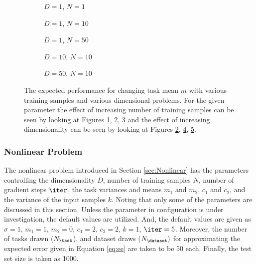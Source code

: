 \begin{figure}[!h]
  \centering
    \begin{subfigure}{0.3\textwidth}
      \centering
      \caption{$D=1$, $N=1$}
      \label{fig:linear-m-N-1-D-1}
    \end{subfigure}
    \begin{subfigure}{0.3\textwidth}
      \centering
      \caption{$D=1$, $N=10$}
      \label{fig:linear-m-N-10-D-1}
    \end{subfigure}
    \begin{subfigure}{0.3\textwidth}
      \centering
      \caption{$D=1$, $N=50$}
      \label{fig:linear-m-N-50-D-1}
    \end{subfigure}

    \begin{subfigure}{0.3\textwidth}
      \centering
      \caption{$D=10$, $N=10$}
      \label{fig:linear-m-N-10-D-10}
    \end{subfigure}
    \begin{subfigure}{0.3\textwidth}
      \centering
      \caption{$D=50$, $N=10$}
      \label{fig:linear-m-N-10-D-50}
    \end{subfigure}  

  \caption{The expected performance for changing task mean $m$ with various training samples and various dimensional problems. For the given parameter the effect of increasing number of training samples can be seen by looking at Figures \ref{fig:linear-m-N-1-D-1}, \ref{fig:linear-m-N-10-D-1}, \ref{fig:linear-m-N-50-D-1} and the effect of increasing dimensionality can be seen by looking at Figures \ref{fig:linear-m-N-10-D-1}, \ref{fig:linear-m-N-10-D-10}, \ref{fig:linear-m-N-10-D-50}.}\label{fig:linear-m}
\end{figure}

\subsubsection{Nonlinear Problem}

The nonlinear problem introduced in Section \ref{sec:Nonlinear} has the parameters controlling the dimensionality $D$, number of training samples $N$, number of gradient steps $\iter$, the task variances and means $m_1$ and $m_2$, $c_1$ and $c_2$, and the variance of the input samples $k$. Noting that only some of the parameters are discussed in this section. Unless the parameter in configuration is under investigation, the default values are utilized. And, the default values are given as $\sigma=1$, $m_1=1$, $m_2=0$, $c_1=2$, $c_2=2$, $k=1$, $\iter=5$. Moreover, the number of tasks drawn ($N_{\task}$), and dataset draws ($N_{\dataset})$  for approximating the expected error given in Equation \ref{eq:ee} are taken to be $50$ each. Finally, the test set size is taken as 1000.

